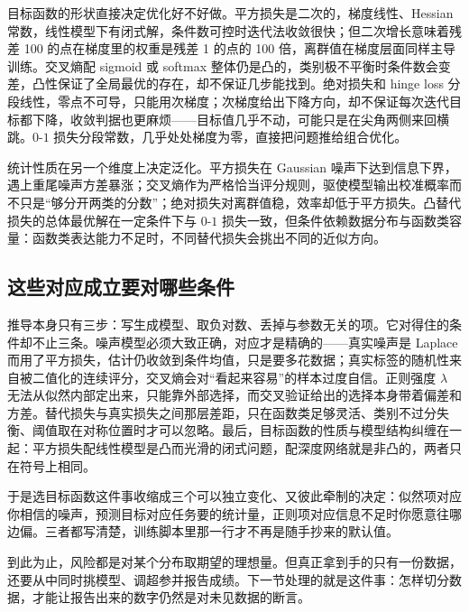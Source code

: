 目标函数的形状直接决定优化好不好做。平方损失是二次的，梯度线性、Hessian 常数，线性模型下有闭式解，条件数可控时迭代法收敛很快；但二次增长意味着残差 100 的点在梯度里的权重是残差 1 的点的 100 倍，离群值在梯度层面同样主导训练。交叉熵配 sigmoid 或 softmax 整体仍是凸的，类别极不平衡时条件数会变差，凸性保证了全局最优的存在，却不保证几步能找到。绝对损失和 hinge loss 分段线性，零点不可导，只能用次梯度；次梯度给出下降方向，却不保证每次迭代目标都下降，收敛判据也更麻烦——目标值几乎不动，可能只是在尖角两侧来回横跳。\(0\)-\(1\) 损失分段常数，几乎处处梯度为零，直接把问题推给组合优化。

统计性质在另一个维度上决定泛化。平方损失在 Gaussian 噪声下达到信息下界，遇上重尾噪声方差暴涨；交叉熵作为严格恰当评分规则，驱使模型输出校准概率而不只是``够分开两类的分数''；绝对损失对离群值稳，效率却低于平方损失。凸替代损失的总体最优解在一定条件下与 \(0\)-\(1\) 损失一致，但条件依赖数据分布与函数类容量：函数类表达能力不足时，不同替代损失会挑出不同的近似方向。

\subsection{这些对应成立要对哪些条件}

推导本身只有三步：写生成模型、取负对数、丢掉与参数无关的项。它对得住的条件却不止三条。噪声模型必须大致正确，对应才是精确的——真实噪声是 Laplace 而用了平方损失，估计仍收敛到条件均值，只是要多花数据；真实标签的随机性来自被二值化的连续评分，交叉熵会对``看起来容易''的样本过度自信。正则强度 \(\lambda\) 无法从似然内部定出来，只能靠外部选择，而交叉验证给出的选择本身带着偏差和方差。替代损失与真实损失之间那层差距，只在函数类足够灵活、类别不过分失衡、阈值取在对称位置时才可以忽略。最后，目标函数的性质与模型结构纠缠在一起：平方损失配线性模型是凸而光滑的闭式问题，配深度网络就是非凸的，两者只在符号上相同。

于是选目标函数这件事收缩成三个可以独立变化、又彼此牵制的决定：似然项对应你相信的噪声，预测目标对应任务要的统计量，正则项对应信息不足时你愿意往哪边偏。三者都写清楚，训练脚本里那一行才不再是随手抄来的默认值。

到此为止，风险都是对某个分布取期望的理想量。但真正拿到手的只有一份数据，还要从中同时挑模型、调超参并报告成绩。下一节处理的就是这件事：怎样切分数据，才能让报告出来的数字仍然是对未见数据的断言。
